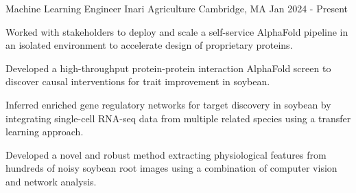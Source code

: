 

\begin{cventries}

  \cventry
    {Machine Learning Engineer} %
    {Inari Agriculture} %
    {Cambridge, MA} %
    {Jan 2024 - Present} %
    {
      \begin{cvitems} %
        \item {Worked with stakeholders to deploy and scale a self-service AlphaFold pipeline in an isolated environment to accelerate design of proprietary proteins.}
        \item {Developed a high-throughput protein-protein interaction AlphaFold screen to discover causal interventions for trait improvement in soybean.}
        \item {Inferred enriched gene regulatory networks for target discovery in soybean by integrating single-cell RNA-seq data from multiple related species using a transfer learning approach.}
        \item {Developed a novel and robust method extracting physiological features from hundreds of noisy soybean root images using a combination of computer vision and network analysis.}
      \end{cvitems}
    }


\end{cventries}
